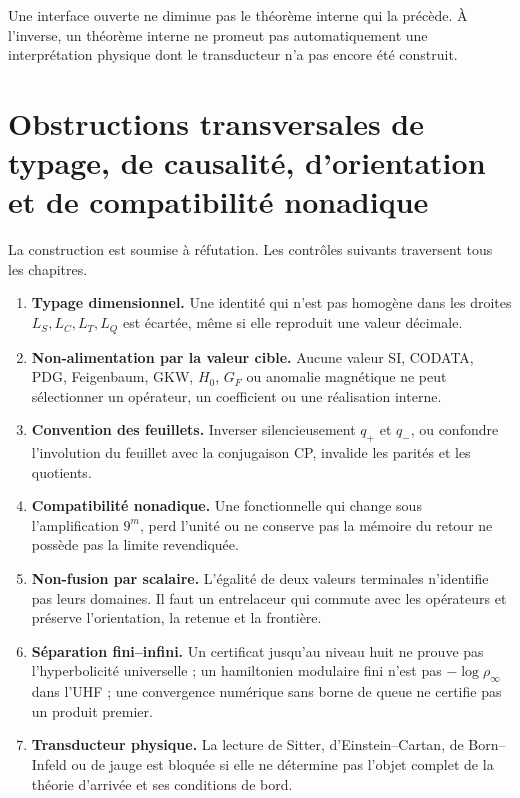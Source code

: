 Une interface ouverte ne diminue pas le théorème interne qui la précède. À
l'inverse, un théorème interne ne promeut pas automatiquement une interprétation
physique dont le transducteur n'a pas encore été construit.

\section{Obstructions transversales de typage, de causalité, d'orientation et de compatibilité nonadique}

La construction est soumise à réfutation. Les contrôles suivants
traversent tous les chapitres.

\begin{enumerate}[label=F\arabic*.]
\item \textbf{Typage dimensionnel.} Une identité qui n'est pas homogène dans les
droites \(L_S,L_C,L_T,L_Q\) est écartée, même si elle reproduit une valeur décimale.

\item \textbf{Non-alimentation par la valeur cible.} Aucune valeur SI, CODATA, PDG,
Feigenbaum, GKW, \(H_0\), \(G_F\) ou anomalie magnétique ne peut sélectionner
un opérateur, un coefficient ou une réalisation interne.

\item \textbf{Convention des feuillets.} Inverser silencieusement \(q_+\) et
\(q_-\), ou confondre l'involution du feuillet avec la conjugaison CP, invalide les
parités et les quotients.

\item \textbf{Compatibilité nonadique.} Une fonctionnelle qui change sous
l'amplification \(9^m\), perd l'unité ou ne conserve pas la mémoire du retour
ne possède pas la limite revendiquée.

\item \textbf{Non-fusion par scalaire.} L'égalité de deux valeurs terminales
n'identifie pas leurs domaines. Il faut un entrelaceur qui commute avec les
opérateurs et préserve l'orientation, la retenue et la frontière.

\item \textbf{Séparation fini--infini.} Un certificat jusqu'au niveau huit
ne prouve pas l'hyperbolicité universelle ; un hamiltonien modulaire fini n'est pas
\(-\log\rho_\infty\) dans l'UHF ; une convergence numérique sans borne de
queue ne certifie pas un produit premier.

\item \textbf{Transducteur physique.} La lecture de Sitter, d'Einstein--Cartan,
de Born--Infeld ou de jauge est bloquée si elle ne détermine pas l'objet complet de la
théorie d'arrivée et ses conditions de bord.
\end{enumerate}

